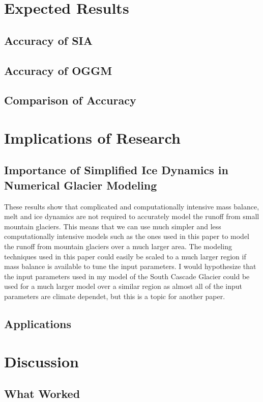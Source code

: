 \documentclass{article}
\begin{document}
\section{Expected Results}
\subsection{Accuracy of SIA}
\subsection{Accuracy of OGGM}
\subsection{Comparison of Accuracy}

\section{Implications of Research}
\subsection{Importance of Simplified Ice Dynamics in Numerical Glacier Modeling}
These results show that complicated and computationally intensive mass balance, melt and ice dynamics are not required to accurately model the 
runoff from small mountain glaciers. This means that we can use much simpler and less computationally intensive models such as the ones used 
in this paper to model the runoff from mountain glaciers over a much larger area. The modeling techniques used in this paper could easily be 
scaled to a much larger region if mass balance is available to tune the input parameters. I would hypothesize that the input parameters used 
in my model of the South Cascade Glacier could be used for a much larger model over a similar region as almost all of the input parameters are 
climate dependet, but this is a topic for another paper. 
\subsection{Applications}

\section{Discussion}
\subsection{What Worked}
\end{document}
